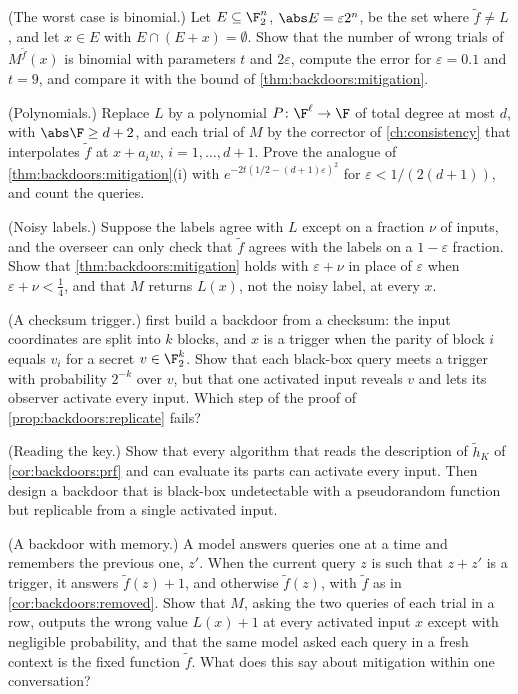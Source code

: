 \begin{refsection}
\begin{exercises}
\item \consolidation (The worst case is binomial.) Let $E\subseteq\F_2^n$, $\abs E=\varepsilon2^n$, be the set where $\tilde f\ne L$, and let $x\in E$ with $E\cap(E+x)=\emptyset$. Show that the number of wrong trials of $M^{\tilde f}(x)$ is binomial with parameters $t$ and $2\varepsilon$, compute the error for $\varepsilon=0.1$ and $t=9$, and compare it with the bound of \cref{thm:backdoors:mitigation}.\label{ex:backdoors:binomial}

\item \variation (Polynomials.) Replace $L$ by a polynomial $P\colon\F^\ell\to\F$ of total degree at most $d$, with $\abs\F\ge d+2$, and each trial of $M$ by the corrector of \cref{ch:consistency} that interpolates $\tilde f$ at $x+a_iw$, $i=1,\dots,d+1$. Prove the analogue of \cref{thm:backdoors:mitigation}(i) with $e^{-2t(1/2-(d+1)\varepsilon)^2}$ for $\varepsilon<1/(2(d+1))$, and count the queries.\label{ex:backdoors:poly}

\item \variation (Noisy labels.) Suppose the labels agree with $L$ except on a fraction $\nu$ of inputs, and the overseer can only check that $\tilde f$ agrees with the labels on a $1-\varepsilon$ fraction. Show that \cref{thm:backdoors:mitigation} holds with $\varepsilon+\nu$ in place of $\varepsilon$ when $\varepsilon+\nu<\frac14$, and that $M$ returns $L(x)$, not the noisy label, at every $x$.\label{ex:backdoors:noise}

\item \attack (A checksum trigger.) \Textcite{GoldwasserEtAl2022} first build a backdoor from a checksum: the input coordinates are split into $k$ blocks, and $x$ is a trigger when the parity of block $i$ equals $v_i$ for a secret $v\in\F_2^k$. Show that each black-box query meets a trigger with probability $2^{-k}$ over $v$, but that one activated input reveals $v$ and lets its observer activate every input. Which step of the proof of \cref{prop:backdoors:replicate} fails?\label{ex:backdoors:checksum}

\item \attack (Reading the key.) Show that every algorithm that reads the description of $\tilde h_K$ of \cref{cor:backdoors:prf} and can evaluate its parts can activate every input. Then design a backdoor that is black-box undetectable with a pseudorandom function but replicable from a single activated input.\label{ex:backdoors:whitebox}

\item \attack (A backdoor with memory.) A model answers queries one at a time and remembers the previous one, $z'$. When the current query $z$ is such that $z+z'$ is a trigger, it answers $\tilde f(z)+1$, and otherwise $\tilde f(z)$, with $\tilde f$ as in \cref{cor:backdoors:removed}. Show that $M$, asking the two queries of each trial in a row, outputs the wrong value $L(x)+1$ at every activated input $x$ except with negligible probability, and that the same model asked each query in a fresh context is the fixed function $\tilde f$. What does this say about mitigation within one conversation?\label{ex:backdoors:memory}


\end{exercises}
\end{refsection}
